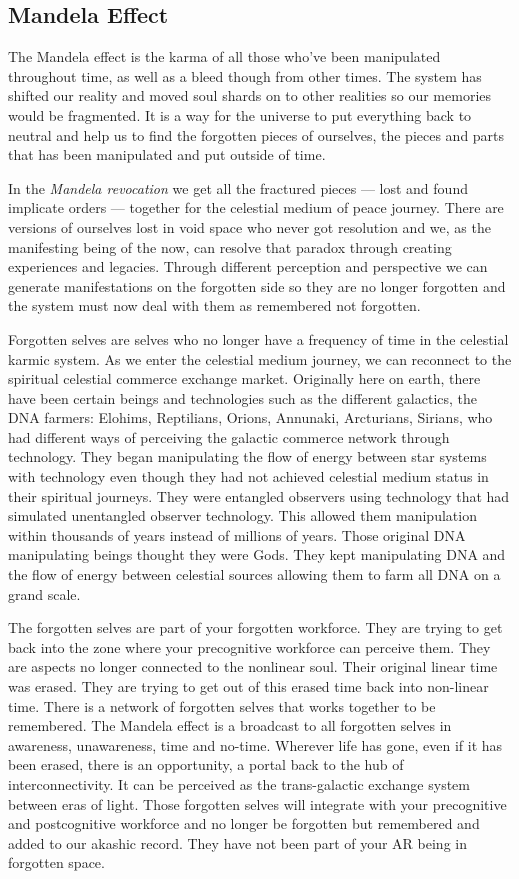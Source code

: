 \subsection{Mandela Effect}\label{mandela-effect}

The Mandela effect is the karma of all those who've been manipulated
throughout time, as well as a bleed though from other times. The system
has shifted our reality and moved soul shards on to other realities so
our memories would be fragmented. It is a way for the universe to put
everything back to neutral and help us to find the forgotten pieces of
ourselves, the pieces and parts that has been manipulated and put
outside of time.

In the \emph{Mandela revocation} we get all the fractured pieces ---
lost and found implicate orders --- together for the celestial medium of
peace journey. There are versions of ourselves lost in void space who
never got resolution and we, as the manifesting being of the now, can
resolve that paradox through creating experiences and legacies. Through
different perception and perspective we can generate manifestations on
the forgotten side so they are no longer forgotten and the system must
now deal with them as remembered not forgotten.

Forgotten selves are selves who no longer have a frequency of time in
the celestial karmic system. As we enter the celestial medium journey,
we can reconnect to the spiritual celestial commerce exchange market.
Originally here on earth, there have been certain beings and
technologies such as the different galactics, the DNA farmers: Elohims,
Reptilians, Orions, Annunaki, Arcturians, Sirians, who had different
ways of perceiving the galactic commerce network through technology.
They began manipulating the flow of energy between star systems with
technology even though they had not achieved celestial medium status in
their spiritual journeys. They were entangled observers using technology
that had simulated unentangled observer technology. This allowed them
manipulation within thousands of years instead of millions of years.
Those original DNA manipulating beings thought they were Gods. They kept
manipulating DNA and the flow of energy between celestial sources
allowing them to farm all DNA on a grand scale.

The forgotten selves are part of your forgotten workforce. They are
trying to get back into the zone where your precognitive workforce can
perceive them. They are aspects no longer connected to the nonlinear
soul. Their original linear time was erased. They are trying to get out
of this erased time back into non-linear time. There is a network of
forgotten selves that works together to be remembered. The Mandela
effect is a broadcast to all forgotten selves in awareness, unawareness,
time and no-time. Wherever life has gone, even if it has been erased,
there is an opportunity, a portal back to the hub of interconnectivity.
It can be perceived as the trans-galactic exchange system between eras
of light. Those forgotten selves will integrate with your precognitive
and postcognitive workforce and no longer be forgotten but remembered
and added to our akashic record. They have not been part of your AR
being in forgotten space.

